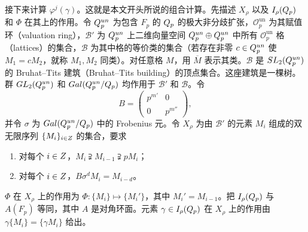 接下来计算 $\varphi^j(\gamma)$。这就是本文开头所说的组合计算。先描述 $X_\rho$ 以及 $I_\rho(Q_p)$ 和 $\Phi$ 在其上的作用。令 $Q_p^{un}$ 为包含 $F_p$ 的 $Q_p$ 的极大非分歧扩张，$\mathcal O_p^{\mathrm{un}}$ 为其赋值环（valuation ring），$\mathcal B'$ 为 $Q_p^{un}$ 上二维向量空间
$Q_p^{un}\oplus Q_p^{un}$ 中所有 $\mathcal O_p^{\mathrm{un}}$ 格（lattices）的集合，$\mathcal B$ 为其中格的等价类的集合（若存在非零 $c\in Q_p^{un}$ 使 $M_1=cM_2$，就称 $M_1,M_2$ 同类）。对任意格 $M$，用 $\overline M$ 表示其类。$\mathcal B$ 是 $SL_2(Q_p^{un})$ 的 Bruhat--Tits 建筑（Bruhat--Tits building）的顶点集合。这座建筑是一棵树。群 $GL_2(Q_p^{un})$ 和 $Gal(Q_p^{un}/Q_p)$ 均作用于 $\mathcal B'$ 和 $\mathcal B$。令
\[
B=\begin{pmatrix}p^{m'}&0\\0&p^{m''}\end{pmatrix},
\]
并令 $\sigma$ 为 $Gal(Q_p^{un}/Q_p)$ 中的 Frobenius 元。令 $X_\rho$ 为由 $\mathcal B'$ 的元素 $M_i$ 组成的双无限序列 $\{M_i\}_{i\in Z}$ 的集合，要求
\begin{enumerate}
\item[(A)] 对每个 $i\in Z$，$M_i\supsetneqq M_{i-1}\supsetneqq pM_i$；
\item[(B)] 对每个 $i\in Z$，$B\sigma^dM_i=M_{i-d}$。
\end{enumerate}
$\Phi$ 在 $X_\rho$ 上的作用为 $\Phi:\{M_i\}\mapsto\{M_i'\}$，其中 $M_i'=M_{i-1}$。把 $I_\rho(Q_p)$ 与 $A(F_p)$ 等同，其中 $A$ 是对角环面。元素 $\gamma\in I_\rho(Q_p)$ 在 $X_\rho$ 上的作用由 $\gamma\{M_i\}=\{\gamma M_i\}$ 给出。

